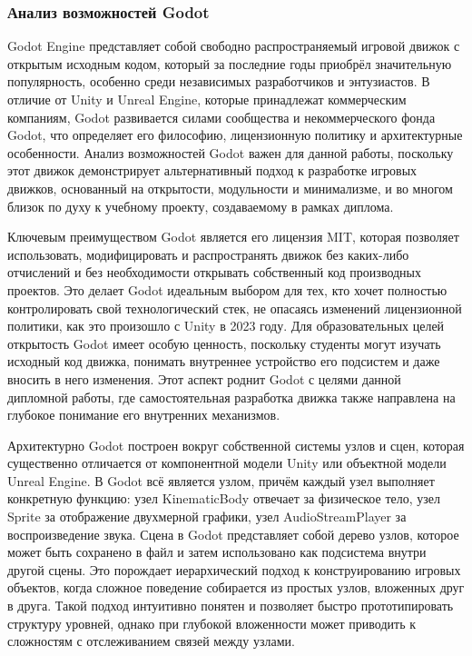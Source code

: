\subsubsection{Анализ возможностей Godot}
Godot Engine представляет собой свободно распространяемый игровой движок с открытым исходным кодом, который за последние годы приобрёл значительную популярность, особенно среди независимых разработчиков и энтузиастов. В отличие от Unity и Unreal Engine, которые принадлежат коммерческим компаниям, Godot развивается силами сообщества и некоммерческого фонда Godot, что определяет его философию, лицензионную политику и архитектурные особенности. Анализ возможностей Godot важен для данной работы, поскольку этот движок демонстрирует альтернативный подход к разработке игровых движков, основанный на открытости, модульности и минимализме, и во многом близок по духу к учебному проекту, создаваемому в рамках диплома.

Ключевым преимуществом Godot является его лицензия MIT, которая позволяет использовать, модифицировать и распространять движок без каких-либо отчислений и без необходимости открывать собственный код производных проектов. Это делает Godot идеальным выбором для тех, кто хочет полностью контролировать свой технологический стек, не опасаясь изменений лицензионной политики, как это произошло с Unity в 2023 году. Для образовательных целей открытость Godot имеет особую ценность, поскольку студенты могут изучать исходный код движка, понимать внутреннее устройство его подсистем и даже вносить в него изменения. Этот аспект роднит Godot с целями данной дипломной работы, где самостоятельная разработка движка также направлена на глубокое понимание его внутренних механизмов.

Архитектурно Godot построен вокруг собственной системы узлов и сцен, которая существенно отличается от компонентной модели Unity или объектной модели Unreal Engine. В Godot всё является узлом, причём каждый узел выполняет конкретную функцию: узел KinematicBody отвечает за физическое тело, узел Sprite за отображение двухмерной графики, узел AudioStreamPlayer за воспроизведение звука. Сцена в Godot представляет собой дерево узлов, которое может быть сохранено в файл и затем использовано как подсистема внутри другой сцены. Это порождает иерархический подход к конструированию игровых объектов, когда сложное поведение собирается из простых узлов, вложенных друг в друга. Такой подход интуитивно понятен и позволяет быстро прототипировать структуру уровней, однако при глубокой вложенности может приводить к сложностям с отслеживанием связей между узлами.
